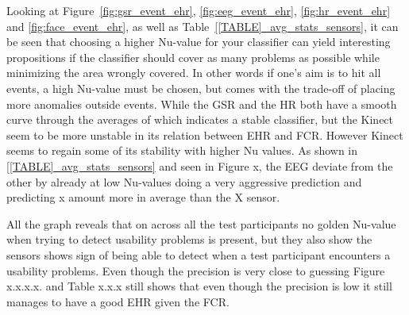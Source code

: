 


Looking at Figure~\ref{fig:gsr_event_ehr}, \ref{fig:eeg_event_ehr}, \ref{fig:hr_event_ehr} and \ref{fig:face_event_ehr},
as well as Table~\ref{[TABLE]_avg_stats_sensors}, it can be seen that choosing a higher Nu-value for your classifier can yield interesting propositions if the classifier should cover as many problems as possible while minimizing the area wrongly covered.
In other words if one's aim is to hit all events, a high Nu-value must be chosen, but comes with the trade-off of placing more anomalies outside events. 
While the GSR and the HR both have a smooth curve through the averages of which indicates a stable classifier, but the Kinect seem to be more unstable in its relation between EHR and FCR. However Kinect seems to regain some of its stability with higher Nu values. As shown in \ref{[TABLE]_avg_stats_sensors} and seen in Figure x, the EEG deviate from the other by already at low Nu-values doing a very aggressive prediction and predicting x amount more in average than the X sensor.

All the graph reveals that on across all the test participants no golden Nu-value when trying to detect usability problems is present, but they also show the sensors shows sign of being able to detect when a test participant encounters a usability problems. Even though the precision is very close to guessing  
Figure x.x.x.x. and Table x.x.x still shows that even though the precision is low it still manages to have a good EHR given the FCR.
